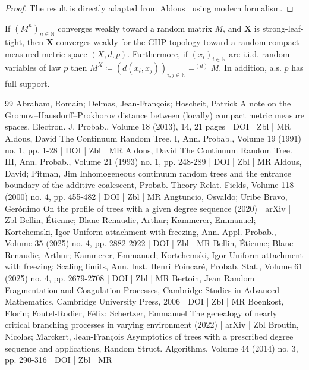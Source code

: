 \documentclass[10pt]{amsart}
\theoremstyle{definition}\newtheorem{defi}[theo]{Definition}\newtheorem{rema}[theo]{Remark}\newtheorem{exam}[theo]{Example}\newtheorem{exem}[theo]{Example}\newtheorem{nota}[theo]{Notation}
\newcommand{\N}{\mathbb{N}}
\newcommand{\1}{\mathbbm{1}}
\newcommand{\bfX}{\mathbf{X}}
\begin{document}
\begin{proof}
The result is directly adapted from Aldous~\cite[Theorem~3]{Ald93} using modern formalism.
\end{proof}

\begin{prop}\label{B2}
If $(M^n)_{n\in \N}$ converges weak\-ly toward a random matrix $M$, and $\bfX$ is strong-leaf-tight, then $\bfX$ converges weakly for the GHP topology toward a random compact measured metric space $(X,d,p)$. Furthermore, if $(x_i)_{i\in \N}$ are i.i.d. random variables of law $p$ then $M^X\coloneqq(d(x_i,x_j))_{i,j\in \N}=^{(d)} M$. In addition, a.s. $p$ has full support.
\end{prop}

\begin{thebibliography}{99}
 Abraham, Romain; Delmas, Jean-François; Hoscheit, Patrick A note on the Gromov–Hausdorff–Prokhorov distance between (locally) compact metric measure spaces, Electron. J. Probab., Volume 18 (2013), 14, 21 pages | DOI | Zbl | MR
 Aldous, David The Continuum Random Tree. I, Ann. Probab., Volume 19 (1991) no. 1, pp. 1-28 | DOI | Zbl | MR
 Aldous, David The Continuum Random Tree. III, Ann. Probab., Volume 21 (1993) no. 1, pp. 248-289 | DOI | Zbl | MR
 Aldous, David; Pitman, Jim Inhomogeneous continuum random trees and the entrance boundary of the additive coalescent, Probab. Theory Relat. Fields, Volume 118 (2000) no. 4, pp. 455-482 | DOI | Zbl | MR
 Angtuncio, Osvaldo; Uribe Bravo, Gerónimo On the profile of trees with a given degree sequence (2020) | arXiv | Zbl
 Bellin, Étienne; Blanc-Renaudie, Arthur; Kammerer, Emmanuel; Kortchemski, Igor Uniform attachment with freezing, Ann. Appl. Probab., Volume 35 (2025) no. 4, pp. 2882-2922 | DOI | Zbl | MR
 Bellin, Étienne; Blanc-Renaudie, Arthur; Kammerer, Emmanuel; Kortchemski, Igor Uniform attachment with freezing: Scaling limits, Ann. Inst. Henri Poincaré, Probab. Stat., Volume 61 (2025) no. 4, pp. 2679-2708 | DOI | Zbl | MR
 Bertoin, Jean Random Fragmentation and Coagulation Processes, Cambridge Studies in Advanced Mathematics, Cambridge University Press, 2006 | DOI | Zbl | MR
 Boenkost, Florin; Foutel-Rodier, Félix; Schertzer, Emmanuel The genealogy of nearly critical branching processes in varying environment (2022) | arXiv | Zbl
 Broutin, Nicolas; Marckert, Jean-François Asymptotics of trees with a prescribed degree sequence and applications, Random Struct. Algorithms, Volume 44 (2014) no. 3, pp. 290-316 | DOI | Zbl | MR

\end{thebibliography}
\end{document}
